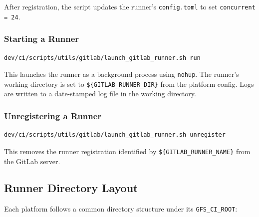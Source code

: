 \documentclass[11pt,letterpaper,twoside]{article}
\begin{document}
After registration, the script updates the runner's \texttt{config.toml} to set
\texttt{concurrent = 24}.

\subsubsection{Starting a Runner}

\begin{lstlisting}[style=bash]
dev/ci/scripts/utils/gitlab/launch_gitlab_runner.sh run
\end{lstlisting}

This launches the runner as a background process using \texttt{nohup}. The
runner's working directory is set to \texttt{\$\{GITLAB\_RUNNER\_DIR\}} from the
platform config. Logs are written to a date-stamped log file in the working
directory.

\subsubsection{Unregistering a Runner}

\begin{lstlisting}[style=bash]
dev/ci/scripts/utils/gitlab/launch_gitlab_runner.sh unregister
\end{lstlisting}

This removes the runner registration identified by
\texttt{\$\{GITLAB\_RUNNER\_NAME\}} from the GitLab server.

\subsection{Runner Directory Layout}
\label{sec:runner-layout}

Each platform follows a common directory structure under its
\texttt{GFS\_CI\_ROOT}:
\end{document}
